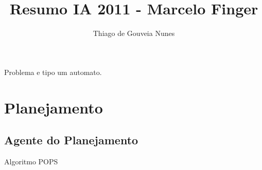\documentclass{report}
\title{Resumo IA 2011 - Marcelo Finger}
\author{Thiago de Gouveia Nunes}
\begin{document}
\maketitle
 
Problema e tipo um automato.
\section{Planejamento}
\subsection{Agente do Planejamento}
Algoritmo POPS
\end{document}
